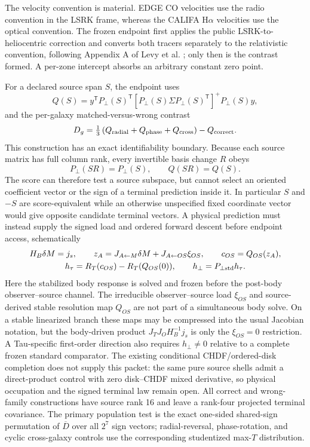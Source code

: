 \documentclass[11pt]{article}
\begin{document}
The velocity convention is material.  EDGE CO velocities use the radio
convention in the LSRK frame, whereas the CALIFA H\(\alpha\) velocities use the
optical convention.  The frozen endpoint first applies the public
LSRK-to-heliocentric correction and converts both tracers separately to the
relativistic convention, following Appendix A of
Levy et al. \cite{Levy2018EDGECALIFAKinematics}; only then is the contrast
formed.  A per-zone intercept absorbs an arbitrary constant zero point.

For a declared source span \(S\), the endpoint uses
\[
 Q(S)=y^{\mathsf T}P_{\perp}(S)^{\mathsf T}
 \left[P_{\perp}(S)\Sigma P_{\perp}(S)^{\mathsf T}\right]^{+}
 P_{\perp}(S)y,
\]
and the per-galaxy matched-versus-wrong contrast
\[
 D_g=\tfrac13\left(Q_{\rm radial}+Q_{\rm phase}+Q_{\rm cross}\right)
      -Q_{\rm correct}.
\]
This construction has an exact identifiability boundary.  Because each source
matrix has full column rank, every invertible basis change \(R\) obeys
\[
 P_{\perp}(SR)=P_{\perp}(S),
 \qquad Q(SR)=Q(S).
\]
The score can therefore test a source subspace, but cannot select an oriented
coefficient vector or the sign of a terminal prediction inside it.  In
particular \(S\) and \(-S\) are score-equivalent while an otherwise unspecified
fixed coordinate vector would give opposite candidate terminal vectors.  A
physical prediction must instead supply the signed load and ordered forward
descent before endpoint access, schematically
\begin{gather*}
 H_B\delta M=j_s,
 \qquad
 z_A=J_{A\leftarrow M}\delta M+J_{A\leftarrow OS}\xi_{OS},
 \qquad
 c_{OS}=Q_{OS}(z_A),\\
 h_{\tau}=R_T(c_{OS})-R_T(Q_{OS}(0)),
 \qquad
 h_{\perp}=P_{\perp{\rm std}}h_{\tau}.
\end{gather*}
Here the stabilized body response is solved and frozen before the post-body
observer--source channel.  The irreducible observer--source load \(\xi_{OS}\)
and source-derived stable resolution map \(Q_{OS}\) are not part of a
simultaneous body solve.  On a stable linearized branch these maps may be
compressed into the usual Jacobian notation, but the body-driven product
\(J_TJ_OH_B^{-1}j_s\) is only the \(\xi_{OS}=0\) restriction.  A Tau-specific
first-order direction also requires \(h_{\perp}\ne0\) relative to a complete
frozen standard comparator.  The existing conditional CHDF/ordered-disk
completion does not supply this packet: the same pure source shells admit a
direct-product control with zero disk--CHDF mixed derivative, so physical
occupation and the signed terminal law remain open.
All correct and wrong-family constructions have source rank 16 and leave a
rank-four projected terminal covariance.  The primary population test is the
exact one-sided shared-sign permutation of \(\overline D\) over all \(2^7\)
sign vectors; radial-reversal, phase-rotation, and cyclic cross-galaxy controls
use the corresponding studentized max-\(T\) distribution.
\end{document}
